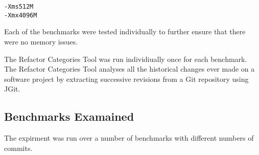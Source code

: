 \begin{verbatim}
-Xms512M 
-Xmx4096M
\end{verbatim}

Each of the benchmarks were tested individually to further ensure that there were no memory issues. 

The Refactor Categories Tool was run individiually once for each benchmark.  The Refactor Categories Tool analyses all the historical changes ever made on a software project by extracting successive revisions from a Git repository using JGit.

\subsection{Benchmarks Examained}
 The expirment was run over a number of benchmarks with different numbers of commits.
 
